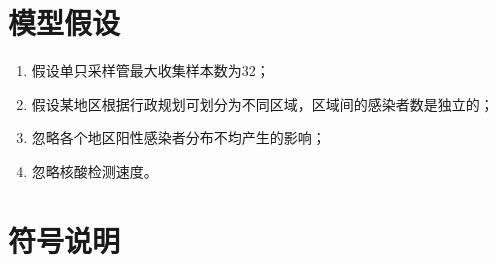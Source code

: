 \documentclass[withoutpreface,bwprint]{cumcmthesis} %
\begin{document}
\section{模型假设}
\begin{enumerate}
    \item 假设单只采样管最大收集样本数为32\cite{max_maps}；
    \item 假设某地区根据行政规划可划分为不同区域，区域间的感染者数是独立的；
    \item 忽略各个地区阳性感染者分布不均产生的影响；
    \item 忽略核酸检测速度。
\end{enumerate}

\section{符号说明}
\end{document}
